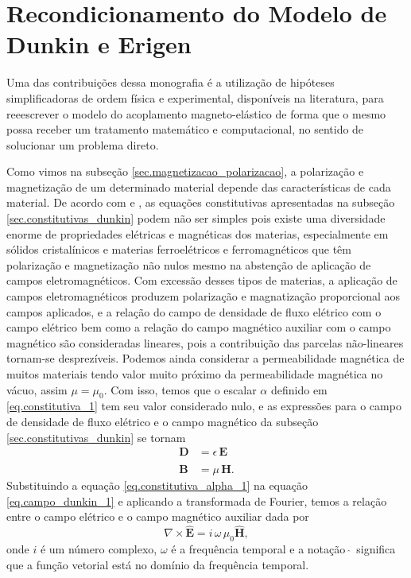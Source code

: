 \chapter{Recondicionamento do Modelo de Dunkin e Erigen}
Uma das contribui\c{c}\~oes dessa monografia \'e a utiliza\c{c}\~ao de hip\'oteses simplificadoras de ordem f\'isica e experimental, dispon\'iveis na literatura, para reeescrever o modelo do acoplamento magneto-el\'astico de forma que o mesmo possa receber um tratamento matem\'atico e computacional, no sentido de solucionar um problema direto.

Como vimos na subse\c{c}\~ao \ref{sec.magnetizacao_polarizacao}, a polariza\c{c}\~ao e magnetiza\c{c}\~ao de um determinado material depende das caracter\'isticas de cada material. De acordo com \cite{jackson_classical_1999} e \cite{griffiths}, as equa\c{c}\~oes constitutivas apresentadas na subse\c{c}\~ao \ref{sec.constitutivas_dunkin} podem n\~ao ser simples pois existe uma diversidade enorme de propriedades el\'etricas e magn\'eticas dos materias, especialmente em s\'olidos cristal\'inicos  e materias ferroel\'etricos e ferromagn\'eticos que t\^em polariza\c{c}\~ao e magnetiza\c{c}\~ao n\~ao nulos mesmo na absten\c{c}\~ao de aplica\c{c}\~ao de campos eletromagn\'eticos. Com excess\~ao desses tipos de materias, a aplica\c{c}\~ao de campos eletromagn\'eticos produzem polariza\c{c}\~ao e magnatiza\c{c}\~ao proporcional aos campos aplicados, e a rela\c{c}\~ao do campo de densidade de fluxo el\'etrico com o campo el\'etrico bem como a rela\c{c}\~ao do campo magn\'etico auxiliar com o campo magn\'etico s\~ao consideradas lineares, pois a contribui\c{c}\~ao das parcelas n\~ao-lineares tornam-se desprez\'iveis. Podemos ainda considerar a permeabilidade magn\'etica de muitos materiais tendo valor muito pr\'oximo da permeabilidade magn\'etica no v\'acuo, assim $\mu=\mu_0$. Com isso, temos que o escalar $\alpha$ definido em \ref{eq.constitutiva_1} tem seu valor considerado nulo, e as express\~oes para o campo de densidade de fluxo el\'etrico e o campo magn\'etico da subse\c{c}\~ao \ref{sec.constitutivas_dunkin} se tornam
\begin{align}\label{eq.constitutiva_alpha_1}
\mathbf{D}&=\epsilon\,\mathbf{E}\\\nonumber\\\label{eq.constitutiva_alpha_2}
\mathbf{B}&=\mu\,\mathbf{H}.
\end{align}
Substituindo a equa\c{c}\~ao \ref{eq.constitutiva_alpha_1} na equa\c{c}\~ao \ref{eq.campo_dunkin_1} e aplicando a transformada de Fourier, temos a rela\c{c}\~ao entre o campo el\'etrico e o campo magn\'etico auxiliar dada por
\begin{equation}
\nabla\times\mathbf{\widehat{E}}=i\,\omega\,\mu_0\mathbf{\widehat{H}},
\end{equation}
onde $i$ \'e um n\'umero complexo, $\omega$ \'e a frequ\^encia temporal e a nota\c{c}\~ao $\widehat{\,\,}$ significa que a fun\c{c}\~ao vetorial est\'a no dom\'inio da frequ\^encia temporal.

